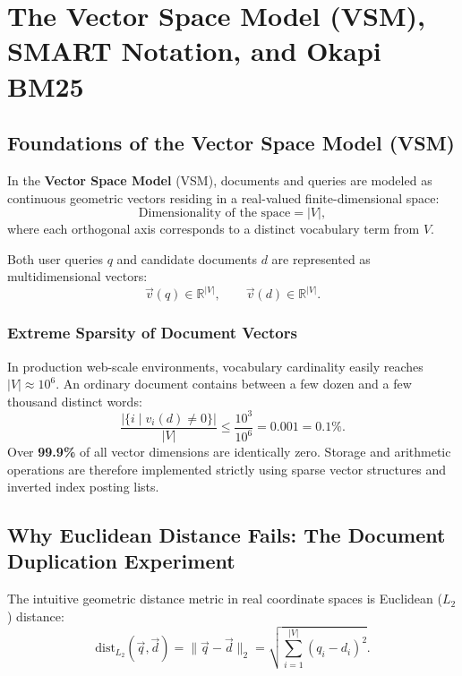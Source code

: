 \chapter{The Vector Space Model (VSM), SMART Notation, and Okapi BM25}
\label{chap:vsm-smart}
\label{chap:retrieval-vsm-bm25-en}

\FloatBarrier
\section{Foundations of the Vector Space Model (VSM)}
\label{sec:vsm-foundations-en}

In the \textbf{Vector Space Model} (VSM), documents and queries are modeled as continuous geometric vectors residing in a real-valued finite-dimensional space:
\begin{equation}
\text{Dimensionality of the space} = |V|,
\end{equation}
where each orthogonal axis corresponds to a distinct vocabulary term from $V$.

Both user queries $q$ and candidate documents $d$ are represented as multidimensional vectors:
\begin{equation}
\vec{v}(q) \in \mathbb{R}^{|V|}, \qquad \vec{v}(d) \in \mathbb{R}^{|V|}.
\end{equation}

\subsection{Extreme Sparsity of Document Vectors}
In production web-scale environments, vocabulary cardinality easily reaches $|V| \approx 10^6$. An ordinary document contains between a few dozen and a few thousand distinct words:
\begin{equation}
\frac{|\{i \mid v_i(d) \ne 0\}|}{|V|} \le \frac{10^3}{10^6} = 0.001 = 0.1\%.
\end{equation}
Over \textbf{99.9\%} of all vector dimensions are identically zero. Storage and arithmetic operations are therefore implemented strictly using sparse vector structures and inverted index posting lists.

\FloatBarrier
\section{Why Euclidean Distance Fails: The Document Duplication Experiment}
\label{sec:euclidean-failure-en}

The intuitive geometric distance metric in real coordinate spaces is Euclidean ($L_2$) distance:
\begin{equation}
\text{dist}_{L_2}(\vec{q}, \vec{d}) = \|\vec{q} - \vec{d}\|_2 = \sqrt{\sum_{i=1}^{|V|} (q_i - d_i)^2}.
\end{equation}

